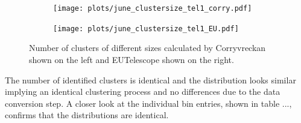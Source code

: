 \begin{figure}
  \hspace{-2.5cm}
  \begin{subfigure}{0.62\textwidth}
      \texttt{[image: plots/june\_clustersize\_tel1\_corry.pdf]}
  \end{subfigure}
  \begin{subfigure}{0.62\textwidth}
      \hspace{0.9cm}
      \texttt{[image: plots/june\_clustersize\_tel1\_EU.pdf]}
  \end{subfigure}
  \caption{Number of clusters of different sizes calculated by Corryvreckan shown on the left and EUTelescope shown on the right.}
  \label{fig:cluster_size}
\end{figure}

The number of identified clusters is identical and the distribution looks similar implying an identical clustering process
and no differences due to the data conversion step. A closer look at the individual bin entries, shown in table ..., confirms that the
distributions are identical.

